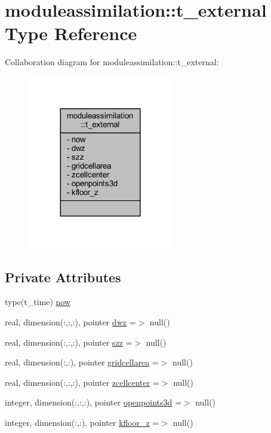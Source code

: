 \hypertarget{structmoduleassimilation_1_1t__external}{}\section{moduleassimilation\+:\+:t\+\_\+external Type Reference}
\label{structmoduleassimilation_1_1t__external}


Collaboration diagram for moduleassimilation\+:\+:t\+\_\+external\+:\nopagebreak
\begin{figure}[H]
\begin{center}
\leavevmode
\includegraphics[width=180pt]{structmoduleassimilation_1_1t__external__coll__graph}
\end{center}
\end{figure}
\subsection*{Private Attributes}
\begin{DoxyCompactItemize}
\item 
type(t\+\_\+time) \mbox{\hyperlink{structmoduleassimilation_1_1t__external_a5a7aa1b202610ee7046adccde69d3c59}{now}}
\item 
real, dimension(\+:,\+:,\+:), pointer \mbox{\hyperlink{structmoduleassimilation_1_1t__external_a4f92f99d220ed1a957e6b5b1f3dc51ab}{dwz}} =$>$ null()
\item 
real, dimension(\+:,\+:,\+:), pointer \mbox{\hyperlink{structmoduleassimilation_1_1t__external_aa429cea4a39e2941a99a9dce7007ee92}{szz}} =$>$ null()
\item 
real, dimension(\+:,\+:), pointer \mbox{\hyperlink{structmoduleassimilation_1_1t__external_afcb570f9d9141765d500d6ce022ad015}{gridcellarea}} =$>$ null()
\item 
real, dimension(\+:,\+:,\+:), pointer \mbox{\hyperlink{structmoduleassimilation_1_1t__external_a756f65b5b3e36568510023ec381b97d2}{zcellcenter}} =$>$ null()
\item 
integer, dimension(\+:,\+:,\+:), pointer \mbox{\hyperlink{structmoduleassimilation_1_1t__external_aa25db0293bcd89bc9da6f290368af692}{openpoints3d}} =$>$ null()
\item 
integer, dimension(\+:,\+:), pointer \mbox{\hyperlink{structmoduleassimilation_1_1t__external_a860afc00bd6e6e6d46514aa3424363ca}{kfloor\+\_\+z}} =$>$ null()
\end{DoxyCompactItemize}


